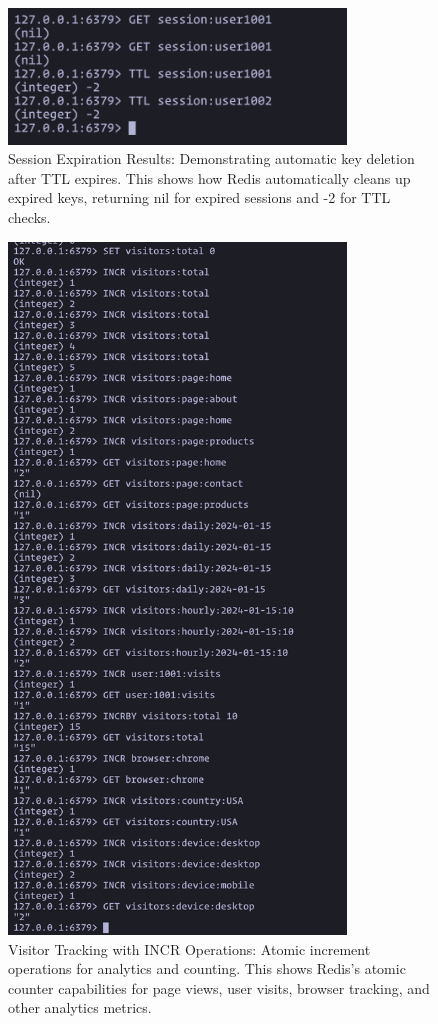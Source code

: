 \begin{figure}[H]
  \centering
  \includegraphics[width=0.8\textwidth]{task-4/screenshots/session-expiration.png}
  \caption{Session Expiration Results: Demonstrating automatic key deletion after TTL expires. This shows how Redis automatically cleans up expired keys, returning nil for expired sessions and -2 for TTL checks.}
  \label{fig:session-expiration}
\end{figure}

\begin{figure}[H]
  \centering
  \includegraphics[width=0.8\textwidth]{task-4/screenshots/visitor-tracking.png}
  \caption{Visitor Tracking with INCR Operations: Atomic increment operations for analytics and counting. This shows Redis's atomic counter capabilities for page views, user visits, browser tracking, and other analytics metrics.}
  \label{fig:visitor-tracking}
\end{figure}

